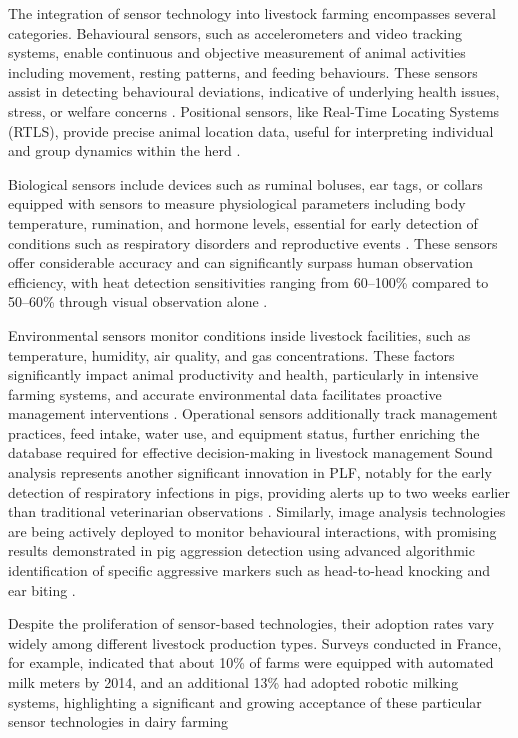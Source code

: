 The integration of sensor technology into livestock farming encompasses several categories. Behavioural sensors, such as accelerometers and video tracking systems, enable continuous and objective measurement of animal activities including movement, resting patterns, and feeding behaviours. These sensors assist in detecting behavioural deviations, indicative of underlying health issues, stress, or welfare concerns \cite{aydin2010application, viazzi2014image, chen2017image}. Positional sensors, like Real-Time Locating Systems (RTLS), provide precise animal location data, useful for interpreting individual and group dynamics within the herd \cite{wagner2020machine}.

Biological sensors include devices such as ruminal boluses, ear tags, or collars equipped with sensors to measure physiological parameters including body temperature, rumination, and hormone levels, essential for early detection of conditions such as respiratory disorders and reproductive events \cite{MOTTRAM20161575, SAINTDIZIER201853}. These sensors offer considerable accuracy and can significantly surpass human observation efficiency, with heat detection sensitivities ranging from 60–100\% compared to 50–60\% through visual observation alone \cite{SAINTDIZIER201853}.

Environmental sensors monitor conditions inside livestock facilities, such as temperature, humidity, air quality, and gas concentrations. These factors significantly impact animal productivity and health, particularly in intensive farming systems, and accurate environmental data facilitates proactive management interventions \cite{FROST200493, halachmi2019smart}. Operational sensors additionally track management practices, feed intake, water use, and equipment status, further enriching the database required for effective decision-making in livestock management \cite{kashiha2013automatic, ANDERSEN20141881} Sound analysis represents another significant innovation in PLF, notably for the early detection of respiratory infections in pigs, providing alerts up to two weeks earlier than traditional veterinarian observations \cite{VANHIRTUM2003677}. Similarly, image analysis technologies are being actively deployed to monitor behavioural interactions, with promising results demonstrated in pig aggression detection using advanced algorithmic identification of specific aggressive markers such as head-to-head knocking and ear biting \cite{viazzi2014image}.

Despite the proliferation of sensor-based technologies, their adoption rates vary widely among different livestock production types. Surveys conducted in France, for example, indicated that about 10\% of farms were equipped with automated milk meters by 2014, and an additional 13\% had adopted robotic milking systems, highlighting a significant and growing acceptance of these particular sensor technologies in dairy farming \cite{allain2015connectivite}

